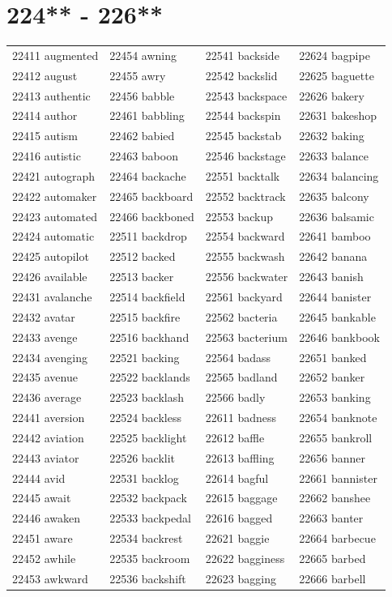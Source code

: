 \documentclass[10pt, oneside]{book}
\begin{document}
\begin{table}
	\centering
	\section*{224** - 226**}
	\begin{tabular}{l l l l}
22411 augmented &22454 awning &22541 backside &22624 bagpipe\\
22412 august &22455 awry &22542 backslid &22625 baguette\\
22413 authentic &22456 babble &22543 backspace &22626 bakery\\
22414 author &22461 babbling &22544 backspin &22631 bakeshop\\
22415 autism &22462 babied &22545 backstab &22632 baking\\
22416 autistic &22463 baboon &22546 backstage &22633 balance\\
22421 autograph &22464 backache &22551 backtalk &22634 balancing\\
22422 automaker &22465 backboard &22552 backtrack &22635 balcony\\
22423 automated &22466 backboned &22553 backup &22636 balsamic\\
22424 automatic &22511 backdrop &22554 backward &22641 bamboo\\
22425 autopilot &22512 backed &22555 backwash &22642 banana\\
22426 available &22513 backer &22556 backwater &22643 banish\\
22431 avalanche &22514 backfield &22561 backyard &22644 banister\\
22432 avatar &22515 backfire &22562 bacteria &22645 bankable\\
22433 avenge &22516 backhand &22563 bacterium &22646 bankbook\\
22434 avenging &22521 backing &22564 badass &22651 banked\\
22435 avenue &22522 backlands &22565 badland &22652 banker\\
22436 average &22523 backlash &22566 badly &22653 banking\\
22441 aversion &22524 backless &22611 badness &22654 banknote\\
22442 aviation &22525 backlight &22612 baffle &22655 bankroll\\
22443 aviator &22526 backlit &22613 baffling &22656 banner\\
22444 avid &22531 backlog &22614 bagful &22661 bannister\\
22445 await &22532 backpack &22615 baggage &22662 banshee\\
22446 awaken &22533 backpedal &22616 bagged &22663 banter\\
22451 aware &22534 backrest &22621 baggie &22664 barbecue\\
22452 awhile &22535 backroom &22622 bagginess &22665 barbed\\
22453 awkward &22536 backshift &22623 bagging &22666 barbell\\
	\end{tabular}
 \end{table}
\clearpage
\end{document}
